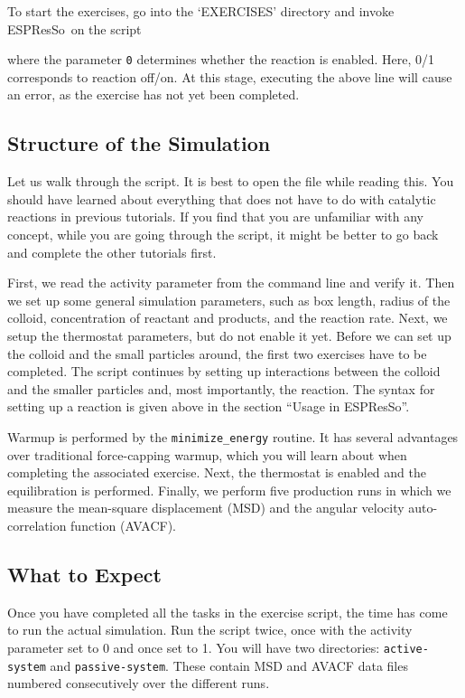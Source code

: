 \documentclass[aip,jcp,reprint,a4paper,onecolumn,nofootinbib,amsmath,amssymb]{revtex4-1}
\newcommand\code{\lstinline}
\newcommand{\es}{\mbox{\textsf{ESPResSo}}\xspace}
\newcommand\codees{\lstinline[language=python]}
\begin{document}
To start the exercises, go into the `EXERCISES' directory and invoke \es\ on the script
where the parameter \code{0} determines whether the reaction is enabled. Here, 0/1 corresponds to reaction off/on. At this stage, executing the above line will cause an error, as the exercise has not yet been completed.

\subsection{Structure of the Simulation}

Let us walk through the script. It is best to open the file while reading this. You should have learned about everything that does not have to do with catalytic reactions in previous tutorials. If you find that you are unfamiliar with any concept, while you are going through the script, it might be better to go back and complete the other tutorials first.

First, we read the activity parameter from the command line and verify it. Then we set up some general simulation parameters, such as box length, radius of the colloid, concentration of reactant and products, and the reaction rate. Next, we setup the thermostat parameters, but do not enable it yet. Before we can set up the colloid and the small particles around, the first two exercises have to be completed. The script continues by setting up interactions between the colloid and the smaller particles and, most importantly, the reaction. The syntax for setting up a reaction is given above in the section ``Usage in \es''.

Warmup is performed by the \codees{minimize_energy} routine. It has several advantages over traditional force-capping warmup, which you will learn about when completing the associated exercise. Next, the thermostat is enabled and the equilibration is performed. Finally, we perform five production runs in which we measure the mean-square displacement (MSD) and the angular velocity auto-correlation function (AVACF).

\subsection{What to Expect}

Once you have completed all the tasks in the exercise script, the time has come to run the actual simulation. Run the script twice, once with the activity parameter set to 0 and once set to 1. You will have two directories: \code{active-system} and \code{passive-system}. These contain MSD and AVACF data files numbered consecutively over the different runs.
\end{document}
